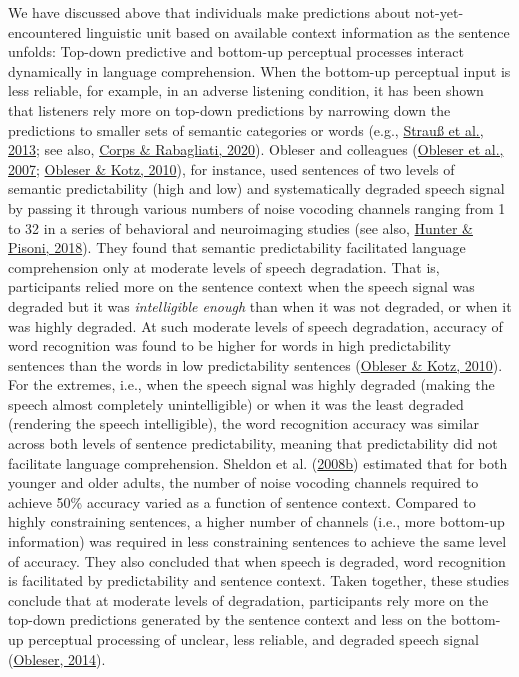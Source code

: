 \documentclass[a4paper, nobind]{templates/ociamthesis}
\begin{document}
We have discussed above that individuals make predictions about not-yet-encountered linguistic unit based on available context information as the sentence unfolds:
Top-down predictive and bottom-up perceptual processes interact dynamically in language comprehension.
When the bottom-up perceptual input is less reliable, for example, in an adverse listening condition, it has been shown that listeners rely more on top-down predictions by narrowing down the predictions to smaller sets of semantic categories or words (e.g., \protect\hyperlink{ref-Strauss2013}{Strauß et al., 2013}; see also, \protect\hyperlink{ref-Corps2020}{Corps \& Rabagliati, 2020}).
Obleser and colleagues (\protect\hyperlink{ref-Obleser2007}{Obleser et al., 2007}; \protect\hyperlink{ref-Obleser2010}{Obleser \& Kotz, 2010}), for instance, used sentences of two levels of semantic predictability (high and low) and systematically degraded speech signal by passing it through various numbers of noise vocoding channels ranging from 1 to 32 in a series of behavioral and neuroimaging studies (see also, \protect\hyperlink{ref-Hunter2018}{Hunter \& Pisoni, 2018}).
They found that semantic predictability facilitated language comprehension only at moderate levels of speech degradation.
That is, participants relied more on the sentence context when the speech signal was degraded but it was \emph{intelligible enough} than when it was not degraded, or when it was highly degraded.
At such moderate levels of speech degradation, accuracy of word recognition was found to be higher for words in high predictability sentences than the words in low predictability sentences (\protect\hyperlink{ref-Obleser2010}{Obleser \& Kotz, 2010}).
For the extremes, i.e., when the speech signal was highly degraded (making the speech almost completely unintelligible) or when it was the least degraded (rendering the speech intelligible),
the word recognition accuracy was similar across both levels of sentence predictability, meaning that predictability did not facilitate language comprehension.
Sheldon et al. (\protect\hyperlink{ref-Sheldon2008b}{2008b}) estimated that for both younger and older adults, the number of noise vocoding channels required to achieve 50\% accuracy varied as a function of sentence context.
Compared to highly constraining sentences, a higher number of channels (i.e., more bottom-up information) was required in less constraining sentences to achieve the same level of accuracy.
They also concluded that when speech is degraded, word recognition is facilitated by predictability and sentence context.
Taken together, these studies conclude that at moderate levels of degradation, participants rely more on the top-down predictions generated by the sentence context and less on the bottom-up perceptual processing of unclear, less reliable, and degraded speech signal (\protect\hyperlink{ref-Obleser2014}{Obleser, 2014}).
\end{document}
